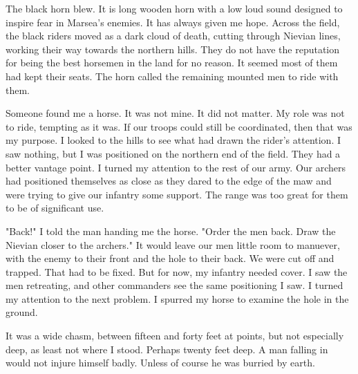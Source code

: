 \documentclass{article}
\begin{document}
The black horn blew. It is long wooden horn with a low loud sound designed to inspire fear in Marsea's enemies. It has always given me hope. Across the field, the black riders moved as a dark cloud of death, cutting through Nievian lines, working their way towards the northern hills. They do not have the reputation for being the best horsemen in the land for no reason. It seemed most of them had kept their seats. The horn called the remaining mounted men to ride with them.

Someone found me a horse. It was not mine. It did not matter. My role was not to ride, tempting as it was. If our troops could still be coordinated, then that was my purpose. I looked to the hills to see what had drawn the rider's attention. I saw nothing, but I was positioned on the northern end of the field. They had a better vantage point. I turned my attention to the rest of our army. Our archers had positioned themselves as close as they dared to the edge of the maw and were trying to give our infantry some support. The range was too great for them to be of significant use.

"Back!" I told the man handing me the horse. "Order the men back. Draw the Nievian closer to the archers." It would leave our men little room to manuever, with the enemy to their front and the hole to their back. We were cut off and trapped. That had to be fixed. But for now, my infantry needed cover. I saw the men retreating, and other commanders see the same positioning I saw. I turned my attention to the next problem. I spurred my horse to examine the hole in the ground.

It was a wide chasm, between fifteen and forty feet at points, but not especially deep, as least not where I stood. Perhaps twenty feet deep. A man falling in would not injure himself badly. Unless of course he was burried by earth. 
\end{document}
